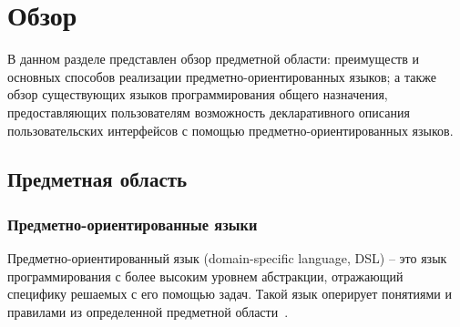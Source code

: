 \section{Обзор}
В данном разделе представлен обзор предметной области: преимуществ и основных способов реализации предметно-ориентированных языков; а также обзор
существующих языков программирования общего назначения, предоставляющих
пользователям возможность декларативного описания пользовательских интерфейсов с помощью предметно-ориентированных языков.

\subsection{Предметная область}
\subsubsection{Предметно-ориентированные языки}
Предметно-ориентированный язык (domain-specific language, DSL) -- это язык
программирования с более высоким уровнем абстракции, отражающий специфику
решаемых с его помощью задач.
Такой язык оперирует понятиями и правилами из определенной предметной
области~\cite{book-of-dsls}.

